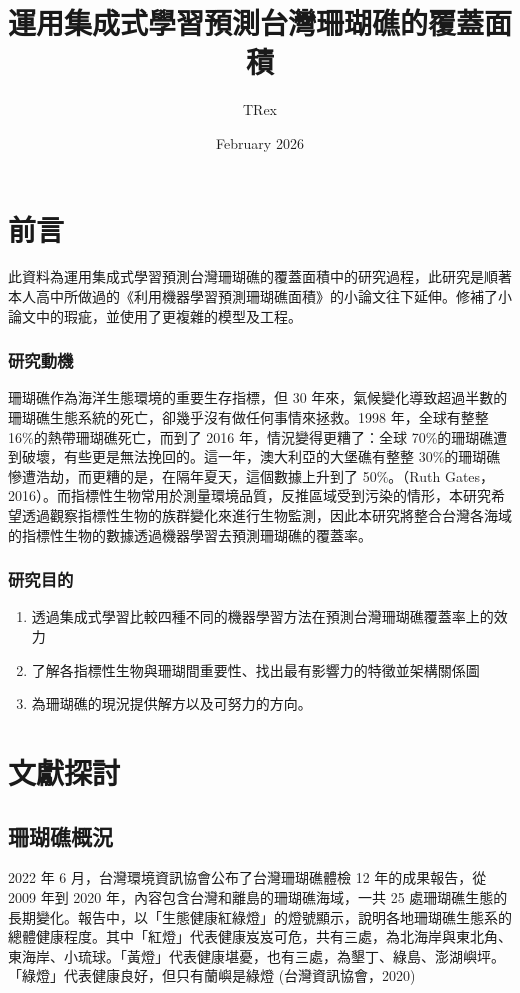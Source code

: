 \documentclass[12pt]{ctexart}
\title{運用集成式學習預測台灣珊瑚礁的覆蓋面積}
\author{TRex}
\date{February 2026}
\begin{document}
\maketitle

\section{前言}
此資料為運用集成式學習預測台灣珊瑚礁的覆蓋面積中的研究過程，此研究是順著本人高中所做過的《利用機器學習預測珊瑚礁面積》的小論文往下延伸。修補了小論文中的瑕疵，並使用了更複雜的模型及工程。

\subsubsection{研究動機}
珊瑚礁作為海洋生態環境的重要生存指標，但 30 年來，氣候變化導致超過半數的珊瑚礁生態系統的死亡，卻幾乎沒有做任何事情來拯救。1998 年，全球有整整16\%的熱帶珊瑚礁死亡，而到了 2016 年，情況變得更糟了：全球 70\%的珊瑚礁遭到破壞，有些更是無法挽回的。這一年，澳大利亞的大堡礁有整整 30\%的珊瑚礁慘遭浩劫，而更糟的是，在隔年夏天，這個數據上升到了 50\%。（Ruth Gates，2016）。而指標性生物常用於測量環境品質，反推區域受到污染的情形，本研究希望透過觀察指標性生物的族群變化來進行生物監測，因此本研究將整合台灣各海域的指標性生物的數據透過機器學習去預測珊瑚礁的覆蓋率。

\subsubsection{研究目的}

\begin{enumerate}
    \item 透過集成式學習比較四種不同的機器學習方法在預測台灣珊瑚礁覆蓋率上的效力
    \item 了解各指標性生物與珊瑚間重要性、找出最有影響力的特徵並架構關係圖
    \item 為珊瑚礁的現況提供解方以及可努力的方向。
\end{enumerate}

\section{文獻探討}

\subsection{珊瑚礁概況}
2022 年 6 月，台灣環境資訊協會公布了台灣珊瑚礁體檢 12 年的成果報告，從 2009 年到 2020 年，內容包含台灣和離島的珊瑚礁海域，一共 25 處珊瑚礁生態的長期變化。報告中，以「生態健康紅綠燈」的燈號顯示，說明各地珊瑚礁生態系的總體健康程度。其中「紅燈」代表健康岌岌可危，共有三處，為北海岸與東北角、東海岸、小琉球。「黃燈」代表健康堪憂，也有三處，為墾丁、綠島、澎湖嶼坪。「綠燈」代表健康良好，但只有蘭嶼是綠燈 (台灣資訊協會，2020)
\end{document}
